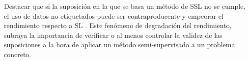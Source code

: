Destacar que si la suposición en la que se basa un método de \gls{SSL} no se cumple, el uso de datos no etiquetados puede ser contraproducente y empeorar el rendimiento respecto a \gls{SL} \cite{zhu2009introduction}. Este fenómeno de degradación del rendimiento, subraya la importancia de verificar o al menos controlar la validez de las suposiciones a la hora de aplicar un método semi-supervisado a un problema concreto.